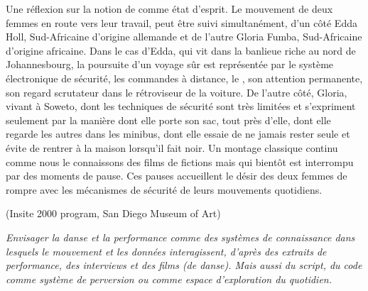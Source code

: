 {{Une r\'eflexion sur la notion de  comme \'etat
d'esprit. Le mouvement de deux femmes en route vers
leur travail, peut \^etre suivi simultan\'ement, d'un
c\^ot\'e Edda Holl, Sud{}-Africaine d'origine
allemande et de l'autre Gloria Fumba, Sud{}-Africaine
d'origine africaine. Dans le cas
d'Edda, qui vit dans la banlieue riche au nord de
Johannesbourg, la poursuite d'un voyage s\^ur est
repr\'esent\'ee par le syst\`eme \'electronique de s\'ecurit\'e, les
commandes \`a distance, le , son attention
permanente, son regard scrutateur dans le r\'etroviseur de la voiture.
De l'autre c\^ot\'e, Gloria, vivant \`a Soweto, dont
les techniques de s\'ecurit\'e sont tr\`es limit\'ees et
s'expriment seulement par la mani\`ere dont elle porte
son sac, tout pr\`es d'elle, dont elle regarde les
autres dans les minibus, dont elle essaie de ne jamais rester seule et
\'evite de rentrer \`a la maison lorsqu'il fait noir.
Un montage classique continu comme nous le connaissons des films de
fictions mais qui bient\^ot est interrompu par des moments de pause.
Ces pauses accueillent le d\'esir des deux femmes de rompre avec les
m\'ecanismes de s\'ecurit\'e de leurs mouvements quotidiens.
\blank
{}


 (Insite 2000 program, San Diego Museum of Art)\par
}

{\em Envisager la danse et la performance comme des syst\`emes de connaissance
dans lesquels le mouvement et les donn\'ees interagissent, d'apr\`es des
extraits de performance, des interviews et des films (de danse). Mais
aussi du script, du code comme syst\`eme de perversion ou comme espace
d'exploration du quotidien.}

}
